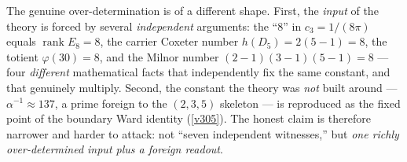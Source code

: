 \documentclass[11pt,a4paper]{article}
\begin{document}
\begin{keybox}
The genuine over-determination is of a different shape. First, the \emph{input} of the theory is forced
by several \emph{independent} arguments: the ``$8$'' in $c_3=1/(8\pi)$ equals $\operatorname{rank}E_8=8$,
the carrier Coxeter number $h(D_5)=2(5{-}1)=8$, the totient $\varphi(30)=8$, and the Milnor number
$(2{-}1)(3{-}1)(5{-}1)=8$ --- four \emph{different} mathematical facts that independently fix the same
constant, and that genuinely multiply. Second, the constant the theory was \emph{not} built around ---
$\alpha^{-1}\approx 137$, a prime foreign to the $(2,3,5)$ skeleton --- is reproduced as the fixed point
of the boundary Ward identity (\vref{v305}). The honest claim is therefore narrower and harder to attack:
not ``seven independent witnesses,'' but \emph{one richly over-determined input plus a foreign readout}.
\end{keybox}
\end{document}
